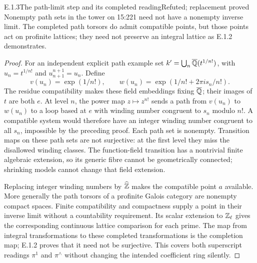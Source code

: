 \begin{result}{E.1.3}{The path-limit step and its completed reading}{Refuted; replacement proved}
Nonempty path sets in the tower on 15:221 need not have a nonempty inverse limit. The completed path torsors do admit compatible points, but those points act on profinite lattices; they need not preserve an integral lattice as E.1.2 demonstrates.
\end{result}
\begin{proof}
For an independent explicit path example set $k'=\bigcup_n\overline{\mathbb Q}(t^{1/n!})$, with $u_n=t^{1/n!}$ and $u_{n+1}^{n+1}=u_n$. Define
\[
 v(u_n)=\exp(1/n!),\qquad
 w(u_n)=\exp(1/n!+2\pi i s_n/n!).
\]
The residue compatibility makes these field embeddings fixing $\overline{\mathbb Q}$; their images of $t$ are both $e$. At level $n$, the power map $z\mapsto z^{n!}$ sends a path from $v(u_n)$ to $w(u_n)$ to a loop based at $e$ with winding number congruent to $s_n$ modulo $n!$. A compatible system would therefore have an integer winding number congruent to all $s_n$, impossible by the preceding proof. Each path set is nonempty. Transition maps on these path sets are not surjective: at the first level they miss the disallowed winding classes. The function-field transition has a nontrivial finite algebraic extension, so its generic fibre cannot be geometrically connected; shrinking models cannot change that field extension.

Replacing integer winding numbers by $\widehat{\mathbb Z}$ makes the compatible point $a$ available. More generally the path torsors of a profinite Galois category are nonempty compact spaces. Finite compatibility and compactness supply a point in their inverse limit without a countability requirement. Its scalar extension to $\mathbb Z_\ell$ gives the corresponding continuous lattice comparison for each prime. The map from integral transformations to these completed transformations is the completion map; E.1.2 proves that it need not be surjective. This covers both superscript readings $\pi^1$ and $\pi^{\wedge}$ without changing the intended coefficient ring silently.
\end{proof}

